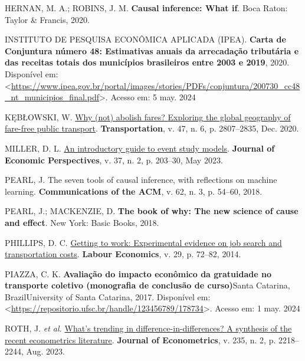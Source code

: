 \documentclass[12pt, a4paper, twoside]{article}
\numberwithin{equation}{subsection} %
\newlength{\cslhangindent}
\newlength{\cslentryspacingunit} %
\newenvironment{CSLReferences}[2] %
 {%
  \setlength{\parindent}{0pt}
  \ifodd #1
  \let\oldpar\par
  \def\par{\hangindent=\cslhangindent\oldpar}
  \fi
  \setlength{\parskip}{#2\cslentryspacingunit}
 }%
 {}
\begin{document}
\begin{CSLReferences}{0}{0}
\leavevmode{}%
HERNAN, M. A.; ROBINS, J. M. \textbf{Causal inference: What if}. Boca
Raton: Taylor \& Francis, 2020.

\leavevmode{}%
INSTITUTO DE PESQUISA ECONÔMICA APLICADA (IPEA). \textbf{Carta de
{Conjuntura} número 48: {Estimativas} anuais da arrecadação tributária e
das receitas totais dos municípios brasileiros entre 2003 e 2019}, 2020.
Disponível em:
\textless{}\url{https://www.ipea.gov.br/portal/images/stories/PDFs/conjuntura/200730_cc48_nt_municipios_final.pdf}\textgreater.
Acesso em: 5 may. 2024

\leavevmode{}%
KĘBŁOWSKI, W. \href{https://doi.org/10.1007/s11116-019-09986-6}{Why
(not) abolish fares? {Exploring} the global geography of fare-free
public transport}. \textbf{Transportation}, v. 47, n. 6, p. 2807--2835,
Dec. 2020.

\leavevmode{}%
MILLER, D. L. \href{https://doi.org/10.1257/jep.37.2.203}{An
introductory guide to event study models}. \textbf{Journal of Economic
Perspectives}, v. 37, n. 2, p. 203--30, May 2023.

\leavevmode{}%
PEARL, J. The seven tools of causal inference, with reflections on
machine learning. \textbf{Communications of the ACM}, v. 62, n. 3, p.
54--60, 2018.

\leavevmode{}%
PEARL, J.; MACKENZIE, D. \textbf{The book of why: The new science of
cause and effect}. New York: Basic Books, 2018.

\leavevmode{}%
PHILLIPS, D. C.
\href{https://doi.org/10.1016/j.labeco.2014.07.005}{Getting to work:
Experimental evidence on job search and transportation costs}.
\textbf{Labour Economics}, v. 29, p. 72--82, 2014.

\leavevmode{}%
PIAZZA, C. K. \textbf{Avaliação do impacto econômico da gratuidade no
transporte coletivo (monografia de conclusão de curso)}Santa Catarina,
BrazilUniversity of Santa Catarina, 2017. Disponível em:
\textless{}\url{https://repositorio.ufsc.br/handle/123456789/178734}\textgreater.
Acesso em: 1 may. 2024

\leavevmode{}%
ROTH, J. \emph{et al.}
\href{https://doi.org/10.1016/j.jeconom.2023.03.008}{What's trending in
difference-in-differences? {A} synthesis of the recent econometrics
literature}. \textbf{Journal of Econometrics}, v. 235, n. 2, p.
2218--2244, Aug. 2023.


\end{CSLReferences}
\end{document}
